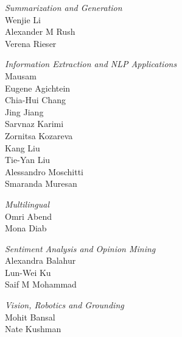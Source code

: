 \emph{Summarization and Generation} \\
\hspace*{0.2in} Wenjie Li \\
\hspace*{0.2in} Alexander M Rush \\
\hspace*{0.2in} Verena Rieser

\emph{Information Extraction and NLP Applications} \\
\hspace*{0.2in} Mausam \\
\hspace*{0.2in} Eugene Agichtein \\
\hspace*{0.2in} Chia-Hui Chang \\
\hspace*{0.2in} Jing Jiang \\
\hspace*{0.2in} Sarvnaz Karimi \\
\hspace*{0.2in} Zornitsa Kozareva \\
\hspace*{0.2in} Kang Liu \\
\hspace*{0.2in} Tie-Yan Liu \\
\hspace*{0.2in} Alessandro Moschitti \\
\hspace*{0.2in} Smaranda Muresan

\emph{Multilingual} \\
\hspace*{0.2in} Omri Abend \\
\hspace*{0.2in} Mona Diab

\emph{Sentiment Analysis and Opinion Mining} \\
\hspace*{0.2in} Alexandra Balahur \\
\hspace*{0.2in} Lun-Wei Ku \\
\hspace*{0.2in} Saif M Mohammad

\emph{Vision, Robotics and Grounding} \\
\hspace*{0.2in} Mohit Bansal \\
\hspace*{0.2in} Nate Kushman

